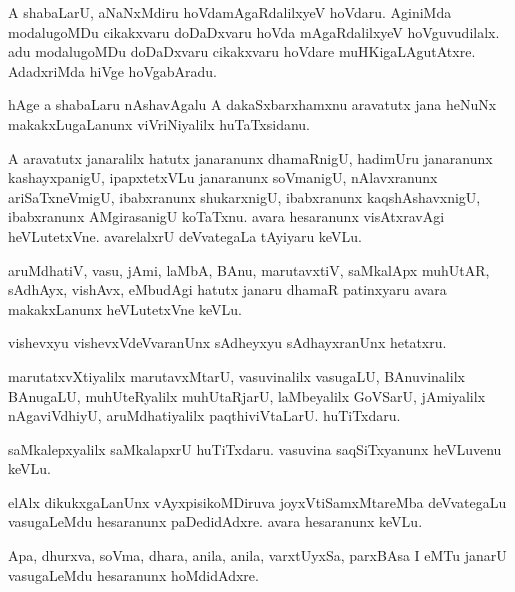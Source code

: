 \documentclass{article}
\begin{document}
\begin{mn}
A shabaLarU, aNaNxMdiru hoVdamAgaRdalilxyeV hoVdaru. AginiMda
modalugoMDu cikakxvaru doDaDxvaru hoVda mAgaRdalilxyeV
hoVguvudilalx. adu modalugoMDu doDaDxvaru cikakxvaru hoVdare
muHKigaLAgutAtxre. AdadxriMda hiVge hoVgabAradu.
\end{mn}

\begin{mn}
hAge a shabaLaru nAshavAgalu A dakaSxbarxhamxnu aravatutx jana heNuNx
makakxLugaLanunx viVriNiyalilx huTaTxsidanu.
\end{mn}

\begin{mn}%
A aravatutx janaralilx hatutx janaranunx dhamaRnigU, hadimUru
janaranunx kashayxpanigU, ipapxtetxVLu janaranunx soVmanigU,
nAlavxranunx ariSaTxneVmigU, ibabxranunx shukarxnigU, ibabxranunx
kaqshAshavxnigU, ibabxranunx AMgirasanigU koTaTxnu. avara hesaranunx
visAtxravAgi heVLutetxVne. avarelalxrU deVvategaLa tAyiyaru keVLu.
\end{mn}

\begin{mn}
aruMdhatiV, vasu, jAmi, laMbA, BAnu, marutavxtiV, saMkalApx muhUtAR,
sAdhAyx, vishAvx, eMbudAgi hatutx janaru dhamaR patinxyaru avara
makakxLanunx heVLutetxVne keVLu.
\end{mn}

\begin{mn}
vishevxyu vishevxVdeVvaranUnx sAdheyxyu sAdhayxranUnx hetatxru.
\end{mn}

\begin{mn}%
marutatxvXtiyalilx marutavxMtarU, vasuvinalilx vasugaLU, BAnuvinalilx
BAnugaLU, muhUteRyalilx muhUtaRjarU, laMbeyalilx GoVSarU, jAmiyalilx
nAgaviVdhiyU, aruMdhatiyalilx paqthiviVtaLarU. huTiTxdaru.
\end{mn}

\begin{mn}
saMkalepxyalilx saMkalapxrU huTiTxdaru. vasuvina saqSiTxyanunx
heVLuvenu keVLu.
\end{mn}

\begin{mn}%
elAlx dikukxgaLanUnx vAyxpisikoMDiruva joyxVtiSamxMtareMba deVvategaLu
vasugaLeMdu hesaranunx paDedidAdxre. avara hesaranunx keVLu.
\end{mn}

\begin{mn}
Apa, dhurxva, soVma, dhara, anila, anila, varxtUyxSa, parxBAsa I eMTu
janarU vasugaLeMdu hesaranunx hoMdidAdxre.
\end{mn}
\end{document}
